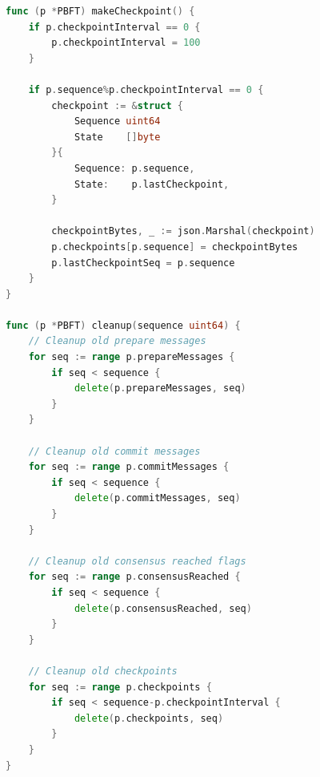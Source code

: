 \documentclass[12pt]{article}
\begin{document}
\begin{lstlisting}[caption={Checkpoint Implementation}, label={lst:checkpoint}, language=Go]
func (p *PBFT) makeCheckpoint() {
    if p.checkpointInterval == 0 {
        p.checkpointInterval = 100
    }

    if p.sequence%p.checkpointInterval == 0 {
        checkpoint := &struct {
            Sequence uint64
            State    []byte
        }{
            Sequence: p.sequence,
            State:    p.lastCheckpoint,
        }

        checkpointBytes, _ := json.Marshal(checkpoint)
        p.checkpoints[p.sequence] = checkpointBytes
        p.lastCheckpointSeq = p.sequence
    }
}

func (p *PBFT) cleanup(sequence uint64) {
    // Cleanup old prepare messages
    for seq := range p.prepareMessages {
        if seq < sequence {
            delete(p.prepareMessages, seq)
        }
    }

    // Cleanup old commit messages
    for seq := range p.commitMessages {
        if seq < sequence {
            delete(p.commitMessages, seq)
        }
    }

    // Cleanup old consensus reached flags
    for seq := range p.consensusReached {
        if seq < sequence {
            delete(p.consensusReached, seq)
        }
    }

    // Cleanup old checkpoints
    for seq := range p.checkpoints {
        if seq < sequence-p.checkpointInterval {
            delete(p.checkpoints, seq)
        }
    }
}
\end{lstlisting}
\end{document}
